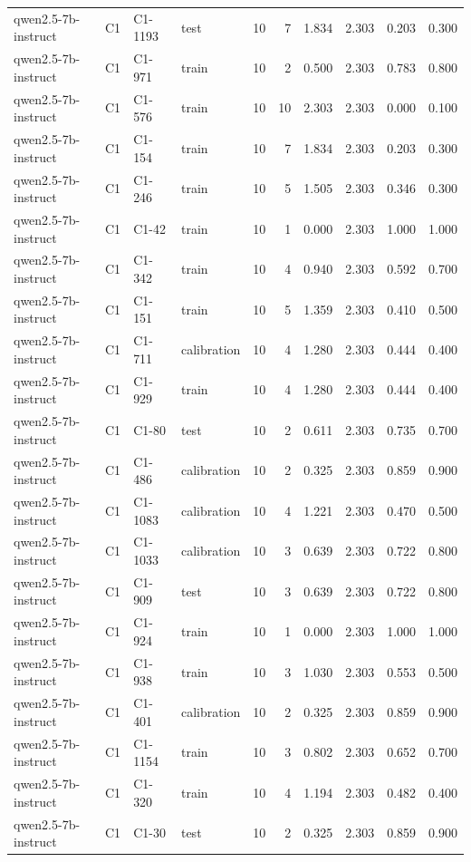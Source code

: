 \begin{table}
\begin{tabular}{llllrrrrrr}
qwen2.5-7b-instruct & C1 & C1-1193 & test & 10 & 7 & 1.834 & 2.303 & 0.203 & 0.300 \\
qwen2.5-7b-instruct & C1 & C1-971 & train & 10 & 2 & 0.500 & 2.303 & 0.783 & 0.800 \\
qwen2.5-7b-instruct & C1 & C1-576 & train & 10 & 10 & 2.303 & 2.303 & 0.000 & 0.100 \\
qwen2.5-7b-instruct & C1 & C1-154 & train & 10 & 7 & 1.834 & 2.303 & 0.203 & 0.300 \\
qwen2.5-7b-instruct & C1 & C1-246 & train & 10 & 5 & 1.505 & 2.303 & 0.346 & 0.300 \\
qwen2.5-7b-instruct & C1 & C1-42 & train & 10 & 1 & 0.000 & 2.303 & 1.000 & 1.000 \\
qwen2.5-7b-instruct & C1 & C1-342 & train & 10 & 4 & 0.940 & 2.303 & 0.592 & 0.700 \\
qwen2.5-7b-instruct & C1 & C1-151 & train & 10 & 5 & 1.359 & 2.303 & 0.410 & 0.500 \\
qwen2.5-7b-instruct & C1 & C1-711 & calibration & 10 & 4 & 1.280 & 2.303 & 0.444 & 0.400 \\
qwen2.5-7b-instruct & C1 & C1-929 & train & 10 & 4 & 1.280 & 2.303 & 0.444 & 0.400 \\
qwen2.5-7b-instruct & C1 & C1-80 & test & 10 & 2 & 0.611 & 2.303 & 0.735 & 0.700 \\
qwen2.5-7b-instruct & C1 & C1-486 & calibration & 10 & 2 & 0.325 & 2.303 & 0.859 & 0.900 \\
qwen2.5-7b-instruct & C1 & C1-1083 & calibration & 10 & 4 & 1.221 & 2.303 & 0.470 & 0.500 \\
qwen2.5-7b-instruct & C1 & C1-1033 & calibration & 10 & 3 & 0.639 & 2.303 & 0.722 & 0.800 \\
qwen2.5-7b-instruct & C1 & C1-909 & test & 10 & 3 & 0.639 & 2.303 & 0.722 & 0.800 \\
qwen2.5-7b-instruct & C1 & C1-924 & train & 10 & 1 & 0.000 & 2.303 & 1.000 & 1.000 \\
qwen2.5-7b-instruct & C1 & C1-938 & train & 10 & 3 & 1.030 & 2.303 & 0.553 & 0.500 \\
qwen2.5-7b-instruct & C1 & C1-401 & calibration & 10 & 2 & 0.325 & 2.303 & 0.859 & 0.900 \\
qwen2.5-7b-instruct & C1 & C1-1154 & train & 10 & 3 & 0.802 & 2.303 & 0.652 & 0.700 \\
qwen2.5-7b-instruct & C1 & C1-320 & train & 10 & 4 & 1.194 & 2.303 & 0.482 & 0.400 \\
qwen2.5-7b-instruct & C1 & C1-30 & test & 10 & 2 & 0.325 & 2.303 & 0.859 & 0.900 \\

\end{tabular}
\end{table}
